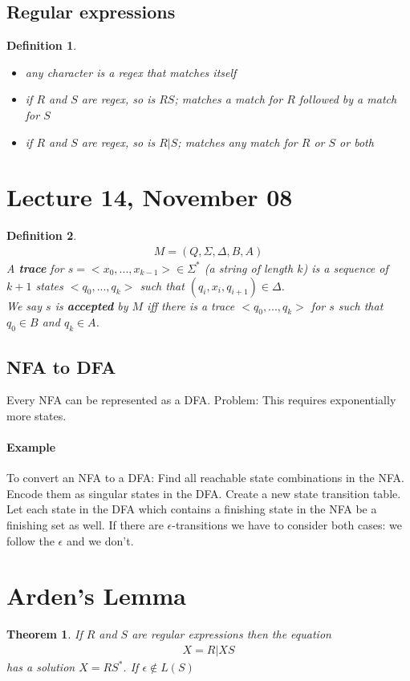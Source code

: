 \documentclass{article}
\newcounter{example}[section]\setcounter{example}{0}
\newenvironment{example}{
\noindent\refstepcounter{example}
\paragraph*{Example}}{}
\theoremstyle{sltheorem}
\newtheorem{definition}{Definition}
\newtheorem{theorem}{Theorem}
\begin{document}
\subsection{Regular expressions}
\begin{definition}
    \begin{itemize}
        \item any character is a regex that matches itself
        \item if $R$ and $S$ are regex, so is $RS$; matches a match for $R$ followed by a match for $S$
        \item if $R$ and $S$ are regex, so is $R|S$; matches any match for $R$ or $S$ or both
    \end{itemize}
\end{definition}
\section{Lecture 14, November 08}
\begin{definition}
    \begin{align*}
        M=(Q,\Sigma, \Delta, B, A)
    \end{align*}
    A \textbf{trace} for $s=<x_0,..., x_{k-1}>\in \Sigma^*$ (a string of length $k$) is a sequence of $k+1$ states $<q_0, ..., q_k>$ such that $(q_i, x_i, q_{i+1})\in\Delta$.\\
    We say $s$ is \textbf{accepted} by $M$ iff there is a trace $<q_0, ..., q_k>$ for $s$ such that $q_0\in B$ and $q_k\in A$.
\end{definition}
\subsection{NFA to DFA}
Every NFA can be represented as a DFA. Problem: This requires exponentially more states.
\begin{example}
    To convert an NFA to a DFA: Find all reachable state combinations in the NFA. Encode them as singular states in the DFA. Create a new state transition table. Let each state in the DFA which contains a finishing state in the NFA be a finishing set as well.
\end{example}
If there are $\epsilon$-transitions we have to consider both cases: we follow the $\epsilon$ and we don't.
\section{Arden's Lemma}
\begin{theorem}
    If $R$ and $S$ are regular expressions then the equation\begin{align*}
        X = R | X S
    \end{align*}
    has a solution $X = R S^*$. If $\epsilon\not\in L(S)$ 
\end{theorem}
\end{document}
